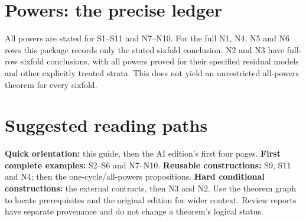\documentclass[10pt,a4paper]{article}
\begin{document}
\section*{Powers: the precise ledger}
All powers are stated for S1--S11 and N7--N10. For the full N1, N4, N5 and N6 rows this package records only the stated sixfold conclusion. N2 and N3 have full-row sixfold conclusions, with all powers proved for their specified residual models and other explicitly treated strata. This does not yield an unrestricted all-powers theorem for every sixfold.
\section*{Suggested reading paths}
\textbf{Quick orientation:} this guide, then the AI edition's first four pages. \textbf{First complete examples:} S2--S6 and N7--N10. \textbf{Reusable constructions:} S9, S11 and N4; then the one-cycle/all-powers propositions. \textbf{Hard conditional constructions:} the external contracts, then N3 and N2. Use the theorem graph to locate prerequisites and the original edition for wider context. Review reports have separate provenance and do not change a theorem's logical status.
\end{document}
